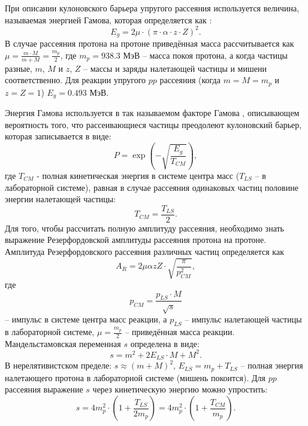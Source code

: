 \documentclass[a4paper,12pt]{article}
\begin{document}
\begin{large}
  При описании кулоновского барьера упругого рассеяния используется величина, называемая энергией Гамова, которая определяется как \cite{Gamow1928,ThermonuclearReactionRates_GamowEnergy}:
\begin{equation}
  \label{GamovEnergyp}
  E_{g}=2 \mu \cdot \left( \pi \cdot \alpha \cdot z \cdot Z \right)^2.
\end{equation}
В случае рассеяния протона на протоне приведённая масса рассчитывается как $\mu=\frac{m \cdot M}{m+M}=\frac{m_p}{2}$, где $m_p=938.3$ МэВ -- масса покоя протона, а когда частицы разные, $m$, $M$ и $z$, $Z$ -- массы и заряды налетающей частицы и мишени соответственно. Для реакции упругого $pp$ рассеяния (когда $m=M=m_p$ и $z=Z=1$) $E_g=0.493$ МэВ.

Энергия Гамова используется в так называемом факторе Гамова \cite{ThermonuclearReactionRates_GamowEnergy}, описывающем вероятность того, что рассеивающиеся частицы преодолеют кулоновский барьер, которая записывается в виде:
\begin{equation}
  \label{GamovPp}
  P=\exp{ \left( -\sqrt{\frac{E_g}{T_{CM}}} \right)  }, 
\end{equation}
где $T_{CM}$ - полная кинетическая энергия в системе центра масс ($T_{LS}$ -- в лабораторной системе), равная в случае рассеяния одинаковых частиц половине энергии налетающей частицы:
\begin{equation}
  \label{GamovFactorp}
  T_{CM}=\frac{T_{LS}}{2}. 
\end{equation}
Для того, чтобы рассчитать полную амплитуду рассеяния, необходимо знать выражение Резерфордовской амплитуды рассеяния протона на протоне. Амплитуда Резерфордовского рассеяния различных частиц определяется как
\begin{equation}
  \label{ARp}
A_R=2\mu \alpha z Z \cdot \sqrt{\frac{\pi}{p_{CM}^2}},
\end{equation}
где 
\begin{equation}
  \label{Pcmp}
  p_{CM}=\frac{p_{LS} \cdot M}{\sqrt{s}}
\end{equation}
-- импульс в системе центра масс реакции, а  $p_{LS}$ -- импульс налетающей частицы в лабораторной системе, $\mu=\frac{m_p}{2}$ -- приведённая масса реакции.
  Мандельстамовская переменная $s$ определена в виде:
\begin{equation}
  \label{MandelstamSp}
s=m^2+2E_{LS}\cdot M+M^2.
\end{equation}
  В нерелятивистском пределе: $s\approx\left( m+M \right)^2$, $E_{LS}=m_p+T_{LS}$ -- полная энергия налетающего протона в лабораторной системе (мишень покоится).
  Для $pp$ рассеяния выражение $s$ через кинетическую энергию можно упростить:
\begin{equation}
  \label{MandelstamSTcmp}
s=4m_p^2 \cdot \left( 1+ \frac{T_{LS}}{2m_p} \right) =4m_p^2 \cdot \left( 1+ \frac{T_{CM}}{m_p} \right).
\end{equation}


\end{large}
\end{document}
